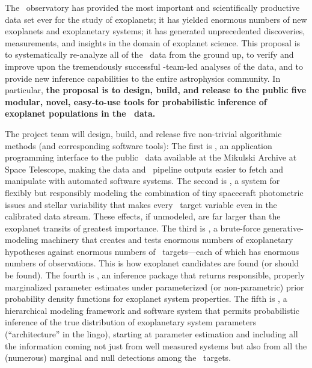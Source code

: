 \documentclass[letterpaper,12pt]{article}
\newcommand{\kplr}{\package{kplr.co}}
\newcommand{\Untrendy}{\package{Untrendy}}
\newcommand{\Turnstile}{\package{IronHorse}}
\newcommand{\Bart}{\package{Bart}}
\newcommand{\TheCreator}{\package{TheCreator}}
\begin{document}
The \Kepler\ observatory has provided the most important and
scientifically productive data set ever for the study of exoplanets;
it has yielded enormous numbers of new exoplanets and exoplanetary
systems; it has generated unprecedented discoveries, measurements, and
insights in the domain of exoplanet science.  This proposal is to
systematically re-analyze all of the \Kepler\ data from the ground up,
to verify and improve upon the tremendously successful
\Kepler-team-led analyses of the data, and to provide new inference
capabilities to the entire astrophysics community.  In particular,
\textbf{the proposal is to design, build, and release to the public
  five modular, novel, easy-to-use tools for probabilistic inference
  of exoplanet populations in the \Kepler\ data.}

The project team will design, build, and release five non-trivial
algorithmic methods (and corresponding software tools): The first is
\kplr, an application programming interface to the public
\Kepler\ data available at the Mikulski Archive at Space Telescope,
making the data and \Kepler\ pipeline outputs easier to fetch and
manipulate with automated software systems.  The second is \Untrendy,
a system for flexibly but responsibly modeling the combination of tiny
spacecraft photometric issues and stellar variability that makes every
\Kepler\ target variable even in the calibrated data stream.  These
effects, if unmodeled, are far larger than the exoplanet transits of
greatest importance.  The third is \Turnstile, a brute-force
generative-modeling machinery that creates and tests enormous numbers
of exoplanetary hypotheses against enormous numbers of
\Kepler\ targets---each of which has enormous numbers of observations.
This is how exoplanet candidates are found (or should be found).  The
fourth is \Bart, an inference package that returns responsible,
properly marginalized parameter estimates under parameterized (or
non-parametric) prior probability density functions for exoplanet
system properties.  The fifth is \TheCreator, a hierarchical modeling
framework and software system that permits probabilistic inference of
the true distribution of exoplanetary system parameters
(``architecture'' in the lingo), starting at parameter estimation and
including all the information coming not just from well measured
systems but also from all the (numerous) marginal and null detections
among the \Kepler\ targets.
\end{document}
